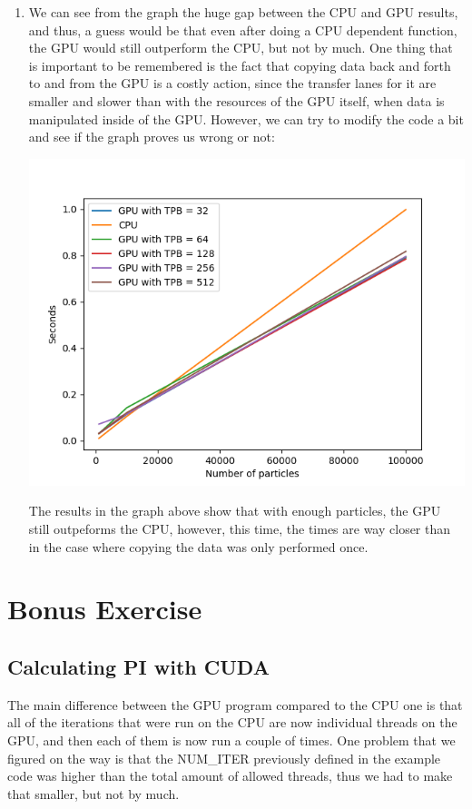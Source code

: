 \documentclass[english]{exam}
\begin{document}
\begin{enumerate}
\begin{center}
  \end{center}
\item We can see from the graph the huge gap between the CPU and GPU results, and thus, a guess would be that even after doing a CPU dependent function, the GPU would still outperform the CPU, but not by much. One thing that is important to be remembered is the fact that copying data back and forth to and from the GPU is a costly action, since the transfer lanes for it are smaller and slower than with the resources of the GPU itself, when data is manipulated inside of the GPU. However, we can try to modify the code a bit and see if the graph proves us wrong or not:
  \begin{center}
    \includegraphics[scale=0.65]{fig2.png}
  \end{center}
  \noindent The results in the graph above show that with enough particles, the GPU still outpeforms the CPU, however, this time, the times are way closer than in the case where copying the data was only performed once.
\end{enumerate}

\clearpage 
\chapter{Bonus Exercise}
\section*{Calculating PI with CUDA}

The main difference between the GPU program compared to the CPU one is that all of the iterations that were run on the CPU are now individual threads on the GPU, and then each of them is now run a couple of times. One problem that we figured on the way is that the NUM\_ITER previously defined in the example code was higher than the total amount of allowed threads, thus we had to make that smaller, but not by much.
\end{document}
